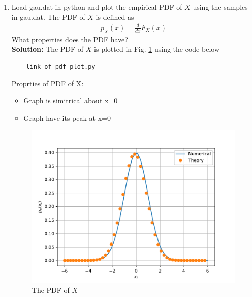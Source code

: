 \documentclass[journal,12pt,twocolumn]{IEEEtran}
\renewcommand\thesection{\arabic{section}}
\theoremstyle{remark}
\newcommand{\solution}{\noindent \textbf{Solution: }}
\numberwithin{equation}{section}
\begin{document}
\begin{enumerate}[label=\thesection.\arabic*
,ref=\thesection.\theenumi]
\begin{itemize}
\end{itemize}
\item
Load gau.dat in python and plot the empirical PDF of $X$ using the samples in gau.dat. The PDF of $X$ is defined as
\begin{align}
p_{X}(x) = \frac{d}{dx}F_{X}(x)
\end{align}
What properties does the PDF have?
\\
\solution The PDF of $X$ is plotted in Fig. \ref{fig:gauss_pdf} using the code below
\begin{lstlisting}
	link of pdf_plot.py
\end{lstlisting}
Proprties of PDF of X:
\begin{itemize}
	\item Graph is simitrical about x=0
	\item Graph have its peak at x=0
\end{itemize}
\begin{figure}[h]
\centering
\includegraphics[width=\columnwidth]{figs/2/gauss_pdf.pdf}
\caption{The PDF of $X$}
\label{fig:gauss_pdf}
\end{figure}


\end{enumerate}
\end{document}
